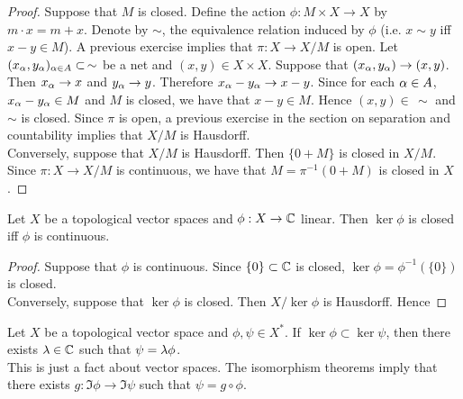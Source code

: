 \documentclass{book}
\begin{document}
	\begin{proof}
		Suppose that $M$ is closed. Define the action $\phi: M \times X \rightarrow X$ by $m \cdot x = m  + x$. Denote by $\sim$, the equivalence relation induced by $\phi$ (i.e. $x \sim y$ iff $x-y \in M$). A previous exercise implies that $\pi: X \rightarrow X /M$ is open. Let $(x_{\alpha},y_{\alpha})_{\alpha \in A} \subset \, \sim$ be a net and $(x,y) \in X \times X$. Suppose that $(x_{\alpha},y_{\alpha}) \rightarrow (x,y)$. Then $x_{\alpha} \rightarrow x$ and $y_{\alpha} \rightarrow y$. Therefore $x_{\alpha} - y_{\alpha} \rightarrow x -y$. Since for each $\alpha \in A$, $x_{\alpha} - y_{\alpha} \in M$ and $M$ is closed, we have that $x -y \in M$. Hence $(x,y) \in \, \sim$ and $\sim$ is closed. Since $\pi$ is open, a previous exercise in the section on separation and countability implies that $X / M$ is Hausdorff. \\
		Conversely, suppose that $X/ M$ is Hausdorff. Then $\{0 + M\}$ is closed in $X /M$. Since $\pi: X \rightarrow X/M$ is continuous, we have that $M =  \pi^{-1}(0 + M)$ is closed in $X$.
	\end{proof}

	\begin{ex}
		Let $X$ be a topological vector spaces and $\phi : X \rightarrow \mathbb{C}$ linear. Then $\ker \phi$ is closed iff $\phi$ is continuous. \\
	\end{ex}
	
	\begin{proof}
		Suppose that $\phi$ is continuous. Since $\{0\} \subset \mathbb{C}$ is closed, $\ker \phi = \phi^{-1}(\{0\})$ is closed. \\ Conversely, suppose that $\ker \phi$ is closed. Then $X/ \ker \phi$ is Hausdorff. Hence 
		\tcb{FINISH!!!}
	\end{proof}
	
	\begin{ex}
		Let $X$ be a topological vector space and $\phi,\psi \in X^*$. If $\ker  \phi \subset \ker \psi$, then there exists $\lambda \in \mathbb{C}$ such that $\psi = \lambda \phi$.\\
		 This is just a fact about vector spaces. The isomorphism theorems imply that there exists $g: \Im \phi \rightarrow \Im \psi$ such that $\psi = g \circ \phi$. 
	\end{ex}
\end{document}
